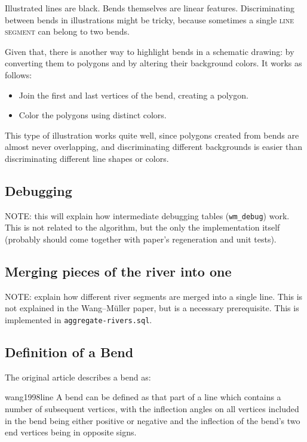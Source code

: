 \documentclass[a4paper]{article}
\newcommand{\WM}{Wang--M{\"u}ller}
\begin{document}
Illustrated lines are black. Bends themselves are linear features.
Discriminating between bends in illustrations might be tricky, because
sometimes a single \textsc{line segment} can belong to two bends.

Given that, there is another way to highlight bends in a schematic drawing: by
converting them to polygons and by altering their background colors. It works
as follows:

\begin{itemize}
    \item Join the first and last vertices of the bend, creating a polygon.
    \item Color the polygons using distinct colors.
\end{itemize}

This type of illustration works quite well, since polygons created from bends
are almost never overlapping, and discriminating different backgrounds is
easier than discriminating different line shapes or colors.

\subsection{Debugging}

NOTE: this will explain how intermediate debugging tables (\texttt{wm\_debug})
work. This is not related to the algorithm, but the only the implementation
itself (probably should come together with paper's regeneration and unit
tests).

\subsection{Merging pieces of the river into one}

NOTE: explain how different river segments are merged into a single line. This
is not explained in the {\WM} paper, but is a necessary prerequisite. This is
implemented in \texttt{aggregate-rivers.sql}.

\subsection{Definition of a Bend}
\label{sec:definition-of-a-bend}

The original article describes a bend as:

\begin{displaycquote}{wang1998line}
    A bend can be defined as that part of a line which contains a number of
    subsequent vertices, with the inflection angles on all vertices included in
    the bend being either positive or negative and the inflection of the bend's
    two end vertices being in opposite signs.
\end{displaycquote}
\end{document}
